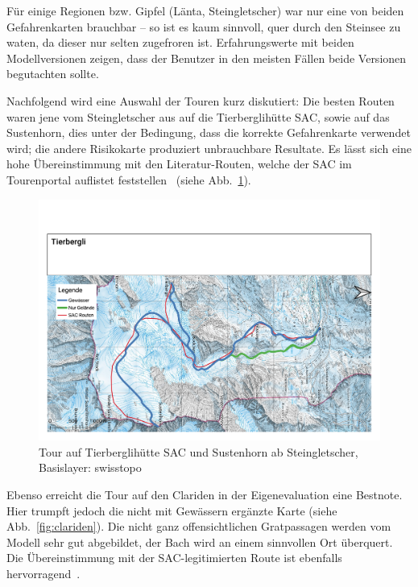 Für einige Regionen bzw. Gipfel (Länta, Steingletscher) war nur eine von beiden Gefahrenkarten brauchbar -- so ist es kaum sinnvoll, quer durch den Steinsee zu waten, da dieser nur selten zugefroren ist. Erfahrungswerte mit beiden Modellversionen zeigen, dass der Benutzer in den meisten Fällen beide Versionen begutachten sollte.

Nachfolgend wird eine Auswahl der Touren kurz diskutiert: Die besten Routen waren jene vom Steingletscher aus auf die Tierberglihütte SAC, sowie auf das Sustenhorn, dies unter der Bedingung, dass die korrekte Gefahrenkarte verwendet wird; die andere Risikokarte produziert unbrauchbare Resultate. Es lässt sich eine hohe Übereinstimmung mit den Literatur-Routen, welche der SAC im Tourenportal auflistet feststellen~\cite{mmzentralch} (siehe Abb.\ \ref{fig:tierbergli}).
\begin{figure}[ht]
  \centering
  \includegraphics[page=1,width=.9\linewidth]{./../evaluation/PDFs/Tierbergli.pdf}
  \caption{Tour auf Tierberglihütte SAC und Sustenhorn ab Steingletscher, \\Basislayer: swisstopo}\label{fig:tierbergli}
\end{figure}


Ebenso erreicht die Tour auf den Clariden in der Eigenevaluation eine Bestnote. Hier trumpft jedoch die nicht mit Gewässern ergänzte Karte (siehe Abb.\ \ref{fig:clariden}). Die nicht ganz offensichtlichen Gratpassagen werden vom Modell sehr gut abgebildet, der Bach wird an einem sinnvollen Ort überquert. Die Übereinstimmung mit der SAC-legitimierten Route ist ebenfalls hervorragend~\cite{twslstgallappzll}.

